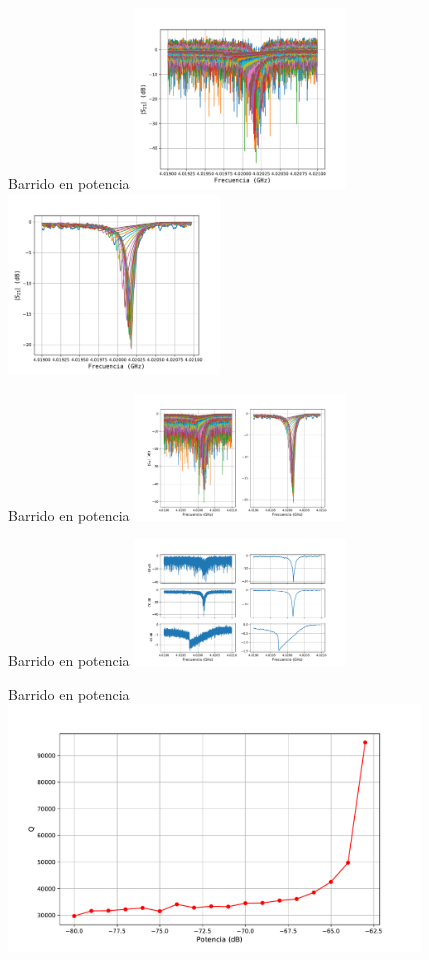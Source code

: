 \documentclass[ignorenonframetext,12pt]{beamer}
\begin{document}
\begin{frame}{Barrido en potencia}
				\centering
												\includegraphics[width=0.42\textwidth]{resonador0_asc_sin_filtro}
												\includegraphics[width=0.42\textwidth]{resonador0_asc_filtro}
\end{frame}
\begin{frame}{Barrido en potencia}
				\centering
												\includegraphics[width=0.42\textwidth]{res0_full_potencias}
\end{frame}
\begin{frame}{Barrido en potencia}
				\centering
												\includegraphics[width=0.42\textwidth]{res0_3_potencias}

\end{frame}
\begin{frame}{Barrido en potencia}
				\centering
												\includegraphics[width=0.82\textwidth]{res0_Q_vs_P}

\end{frame}
\end{document}
